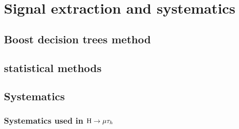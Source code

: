 %
%
%
%
%
%
%
%
%
%

%
%

\chapter{Signal extraction and systematics}

\section{Boost decision trees method} \label{BDTchaper}

\section{statistical methods}

\section{Systematics}
\subsection{Systematics used in $\mathrm{H}\to \mu\tau_{h}$}


